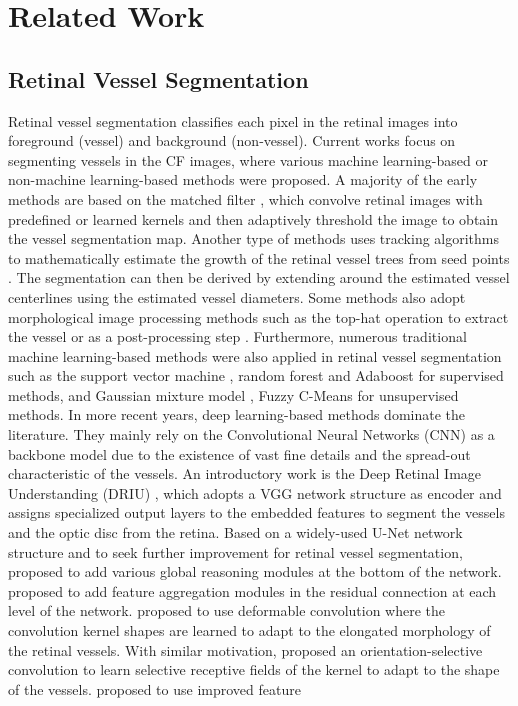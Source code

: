 \section{Related Work}
\subsection{Retinal Vessel Segmentation}
Retinal vessel segmentation classifies each pixel in the retinal images into foreground (vessel) and background (non-vessel). Current works focus on segmenting vessels in the CF images, where various machine learning-based or non-machine learning-based methods were proposed. A majority of the early methods are based on the matched filter \cite{Vesseg-MF-Chaudhuri, Vesseg-MF-Kovacs, Dataset-HRF}, which convolve retinal images with predefined or learned kernels and then adaptively threshold the image to obtain the vessel segmentation map. Another type of methods uses tracking algorithms to mathematically estimate the growth of the retinal vessel trees from seed points \cite{Vesseg-Tracking-Delibasis, Vesseg-Tracking-Lin}. The segmentation can then be derived by extending around the estimated vessel centerlines using the estimated vessel diameters. Some methods also adopt morphological image processing methods such as the top-hat operation to extract the vessel or as a post-processing step \cite{Vesseg-Morph-Graz, Vesseg-Morph-Imani}. Furthermore, numerous traditional machine learning-based methods were also applied in retinal vessel segmentation such as the support vector machine \cite{Vesseg-SVM-Tang}, random forest \cite{Vesseg-RF-Wang} and Adaboost \cite{Vesseg-Adaboost-Memari} for supervised methods, and Gaussian mixture model \cite{Vesseg-GMM-Roy}, Fuzzy C-Means \cite{Vesseg-FCM-Neto} for unsupervised methods. In more recent years, deep learning-based methods dominate the literature. They mainly rely on the Convolutional Neural Networks (CNN) as a backbone model due to the existence of vast fine details and the spread-out characteristic of the vessels. An introductory work is the Deep Retinal Image Understanding (DRIU) \cite{Vesseg-CNN-DRIU}, which adopts a VGG \cite{Others-VGG} network structure as encoder and assigns specialized output layers to the embedded features to segment the vessels and the optic disc from the retina. Based on a widely-used U-Net \cite{Others-U-Net} network structure and to seek further improvement for retinal vessel segmentation, \cite{Vesseg-CNN-CENet, Vesseg-CNN-CS2Net, Vesseg-CNN-GlobalTransformer, Vesseg-CNN-MCDAUNet, Vesseg-CNN-MCGNet} proposed to add various global reasoning modules at the bottom of the network. \cite{Vesseg-CNN-MCDAUNet, Vesseg-CNN-MCGNet, Vesseg-CNN-RCARUNet, Vesseg-CNN-WaveNet, Vesseg-CNN-GlobalTransformer} proposed to add feature aggregation modules in the residual connection at each level of the network. \cite{Vesseg-CNN-DUNet, Topo-TCLoss} proposed to use deformable convolution where the convolution kernel shapes are learned to adapt to the elongated morphology of the retinal vessels. With similar motivation, \cite{Vesseg-CNN-WSDMF} proposed an orientation-selective convolution to learn selective receptive fields of the kernel to adapt to the shape of the vessels. \cite{Vesseg-CNN-GlobalTransformer} proposed to use improved feature 